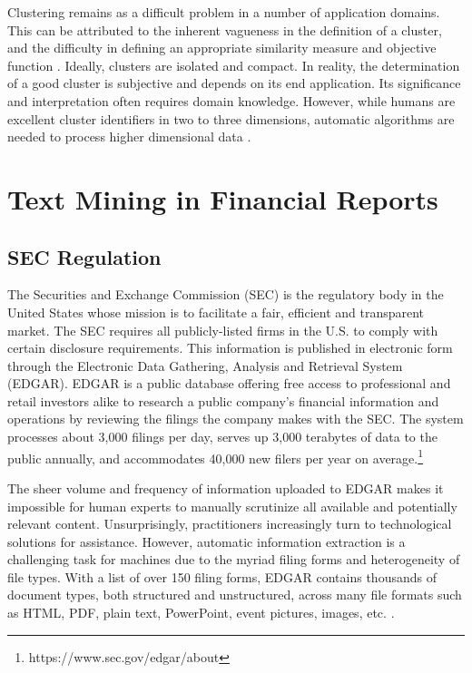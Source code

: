 Clustering remains as a difficult problem in a number of application domains. This can be attributed to the inherent vagueness in the definition of a cluster, and the difficulty in defining an appropriate similarity measure and objective function \cite{Jain2010}. Ideally, clusters are isolated and compact. In reality, the determination of a good cluster is subjective and depends on its end application. Its significance and interpretation often requires domain knowledge. However, while humans are excellent cluster identifiers in two to three dimensions, automatic algorithms are needed to process higher dimensional data \cite{Xu2015Survey}. 



\section{Text Mining in Financial Reports}\label{sec:financial}

\subsection{SEC Regulation} \label{subsec:SEC}

The Securities and Exchange Commission (SEC) is the regulatory body in the United States whose mission is to facilitate a fair, efficient and transparent market. The SEC requires all publicly-listed firms in the U.S. to comply with certain disclosure requirements. This information is published in electronic form through the Electronic Data Gathering, Analysis and Retrieval System (EDGAR). EDGAR is a public database offering free access to professional and retail investors alike to research a public company's financial information and operations by reviewing the filings the company makes with the SEC. The system processes about 3,000 filings per day, serves up 3,000 terabytes of data to the public annually, and accommodates 40,000 new filers per year on average.\footnote {https://www.sec.gov/edgar/about} 

The sheer volume and frequency of information uploaded to EDGAR makes it impossible for human experts to manually scrutinize all available and potentially relevant content. Unsurprisingly, practitioners increasingly turn to technological solutions for assistance. However, automatic information extraction is a challenging task for machines due to the myriad filing forms and heterogeneity of file types. With a list of over 150 filing forms, EDGAR contains thousands of document types, both structured and unstructured, across many file formats such as HTML, PDF, plain text, PowerPoint, event pictures, images, etc. \cite{OpenEDGAR2008}.

